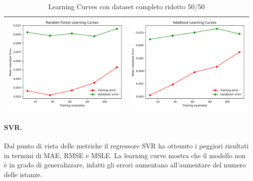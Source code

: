\begin{table}[H]
\begin{tabularx}{\textwidth}{|X|X|}
        \includegraphics[width=\linewidth, trim=0 0 0 0]{images/RandomForest_lc50_ridotto.png} &
        \includegraphics[width=\linewidth, trim=0 0 0 0]{images/AdaBoost_lc50_ridotto.png} \\
        \hline
    \end{tabularx}
    \caption{Learning Curves con dataset completo ridotto 50/50}
    \label{tab:emissions_info}
\end{table}

\paragraph{\textbf{SVR}.}
Dal punto di vista delle metriche il regressore SVR ha ottenuto i peggiori risultati in termini di MAE, RMSE e MSLE. La learning curve mostra che il modello non è in grado di generalizzare, infatti gli errori aumentano all'aumentare del numero delle istanze.

